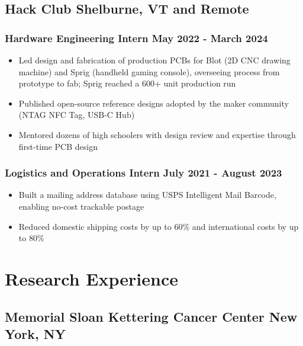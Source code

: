 \documentclass[10pt]{article}
\begin{document}
\subsection{Hack Club \hfill Shelburne, VT and Remote}
\subsubsection{Hardware Engineering Intern \hfill May 2022 - March 2024}
\begin{itemize}
    \item Led design and fabrication of production PCBs for Blot (2D CNC drawing machine) and Sprig (handheld gaming console), overseeing process from prototype to fab; Sprig reached a 600+ unit production run
    \item Published open-source reference designs adopted by the maker community (NTAG NFC Tag, USB-C Hub)
    \item Mentored dozens of high schoolers with design review and expertise through first-time PCB design
\end{itemize}
\subsubsection{Logistics and Operations Intern \hfill July 2021 - August 2023}
\begin{itemize}
    \item Built a mailing address database using USPS Intelligent Mail Barcode, enabling no-cost trackable postage
    \item Reduced domestic shipping costs by up to 60\% and international costs by up to 80\% %
\end{itemize}

\section{Research Experience}
\subsection{Memorial Sloan Kettering Cancer Center \hfill New York, NY}
\end{document}
